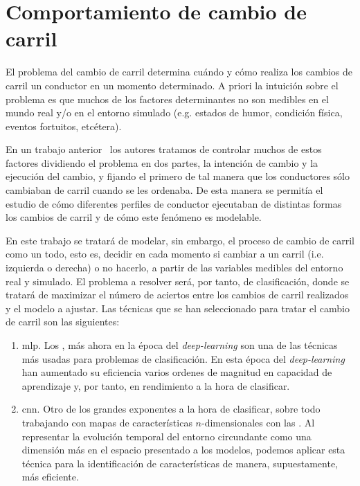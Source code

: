 \chapter{Comportamiento de cambio de carril}
\label{ch:lane-change-model}

El problema del cambio de carril determina cuándo y cómo realiza los cambios de carril un conductor en un momento determinado. A priori la intuición sobre el problema es que muchos de los factores determinantes no son medibles en el mundo real y/o en el entorno simulado (e.g. estados de humor, condición física, eventos fortuitos, etcétera).

En un trabajo anterior~\cite{diaz2018modelling} los autores tratamos de controlar muchos de estos factores dividiendo el problema en dos partes, la intención de cambio y la ejecución del cambio, y fijando el primero de tal manera que los conductores sólo cambiaban de carril cuando se les ordenaba. De esta manera se permitía el estudio de cómo diferentes perfiles de conductor ejecutaban de distintas formas los cambios de carril y de cómo este fenómeno es modelable.

En este trabajo se tratará de modelar, sin embargo, el proceso de cambio de carril como un todo, esto es, decidir en cada momento si cambiar a un carril (i.e. izquierda o derecha) o no hacerlo, a partir de las variables medibles del entorno real y simulado. El problema a resolver será, por tanto, de clasificación, donde se tratará de maximizar el número de aciertos entre los cambios de carril realizados y el modelo a ajustar. Las técnicas que se han seleccionado para tratar el cambio de carril son las siguientes:

\begin{enumerate}
	\item \acrshort{mlp}. Los , más ahora en la época del \textit{deep-learning} son una de las técnicas más usadas para problemas de clasificación. En esta época del \textit{deep-learning} han aumentado su eficiencia varios ordenes de magnitud en capacidad de aprendizaje y, por tanto, en rendimiento a la hora de clasificar.
	\item \acrshort{cnn}. Otro de los grandes exponentes a la hora de clasificar, sobre todo trabajando con mapas de características $n$-dimensionales con las . Al representar la evolución temporal del entorno circundante como una dimensión más en el espacio presentado a los modelos, podemos aplicar esta técnica para la identificación de características de manera, supuestamente, más eficiente.
\end{enumerate}

